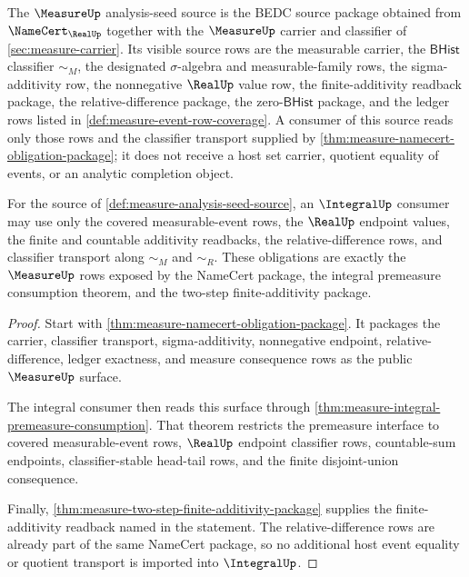 \begin{definition}
\label{def:measure-analysis-seed-source}
The $\MeasureUp$ analysis-seed source is the BEDC source package obtained from
$\NameCert_{\RealUp}$ together with the $\MeasureUp$ carrier and classifier of
\autoref{sec:measure-carrier}. Its visible source rows are the measurable
carrier, the $\mathsf{BHist}$ classifier $\sim_M$, the designated
$\sigma$-algebra and measurable-family rows, the sigma-additivity row, the
nonnegative $\RealUp$ value row, the finite-additivity readback package, the
relative-difference package, the zero-$\mathsf{BHist}$ package, and the ledger
rows listed in \autoref{def:measure-event-row-coverage}. A consumer of this
source reads only those rows and the classifier transport supplied by
\autoref{thm:measure-namecert-obligation-package}; it does not receive a host
set carrier, quotient equality of events, or an analytic completion object.
\end{definition}

\begin{theorem}
\label{thm:measure-integral-substrate-obligations}
For the source of \autoref{def:measure-analysis-seed-source}, an
$\IntegralUp$ consumer may use only the covered measurable-event rows, the
$\RealUp$ endpoint values, the finite and countable additivity readbacks, the
relative-difference rows, and classifier transport along $\sim_M$ and
$\sim_R$. These obligations are exactly the $\MeasureUp$ rows exposed by the
NameCert package, the integral premeasure consumption theorem, and the
two-step finite-additivity package.
\end{theorem}
\begin{proof}
Start with \autoref{thm:measure-namecert-obligation-package}. It packages the
carrier, classifier transport, sigma-additivity, nonnegative endpoint,
relative-difference, ledger exactness, and measure consequence rows as the
public $\MeasureUp$ surface.

The integral consumer then reads this surface through
\autoref{thm:measure-integral-premeasure-consumption}. That theorem restricts
the premeasure interface to covered measurable-event rows, $\RealUp$ endpoint
classifier rows, countable-sum endpoints, classifier-stable head-tail rows,
and the finite disjoint-union consequence.

Finally, \autoref{thm:measure-two-step-finite-additivity-package} supplies
the finite-additivity readback named in the statement. The relative-difference
rows are already part of the same NameCert package, so no additional host
event equality or quotient transport is imported into $\IntegralUp$.
\end{proof}

